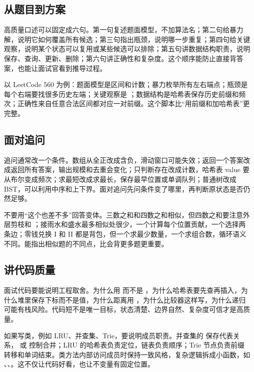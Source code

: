 \subsection{从题目到方案}

高质量口述可以固定成六句。第一句复述题面模型，不加算法名；第二句给暴力解，说明它如何覆盖所有候选；第三句指出瓶颈，说明哪一步重复；第四句给关键观察，说明某个状态可以复用或某些候选可以排除；第五句讲数据结构职责，说明保存、查询、更新、删除；第六句讲正确性和复杂度。这个顺序能防止直接背答案，也能让面试官看到推导过程。

以 LeetCode 560 为例：题面模型是区间和计数；暴力枚举所有左右端点；瓶颈是每个右端要找很多历史左端；关键观察是 ；数据结构是哈希表保存历史前缀和频次；正确性来自任意合法区间都对应一对前缀。这个脚本比“用前缀和加哈希表”更完整。

\subsection{面对追问}

追问通常改一个条件。数组从全正改成含负，滑动窗口可能失效；返回一个答案改成返回所有答案，输出规模和去重会变化；只判断存在改成计数，哈希表 value 要从布尔变成频次；求最短改成求最长，保存最早位置或单调队列；普通树改成 BST，可以利用中序和上下界。面对追问先问条件变了哪里，再判断原状态是否仍然足够。

不要用“这个也差不多”回答变体。三数之和和四数之和相似，但四数之和要注意外层剪枝和 ；接雨水和盛水最多相似处很少，一个计算每个位置贡献，一个选择两条边；零钱兑换 I 和 II 都是背包，但一个求最少数量，一个求组合数，循环语义不同。能指出相似题的不同点，比会背更多题更重要。

\subsection{讲代码质量}

面试代码要能说明工程取舍。为什么用  而不是 ，为什么哈希表要先查再插入，为什么堆里保存下标而不是值，为什么距离用 ，为什么比较器这样写，为什么递归可能有栈风险。代码短不是唯一目标，状态清楚、边界自然、复杂度可信才是高质量。

如果写类，例如 LRU、并查集、Trie，要说明成员职责。并查集的  保存代表关系， 或  控制合并；LRU 的哈希表负责定位，链表负责顺序；Trie 节点负责前缀转移和单词结束。类方法内部访问成员时保持一致风格，复杂逻辑拆成小函数，如 、、。这不仅让代码好看，也让不变量有固定位置。

